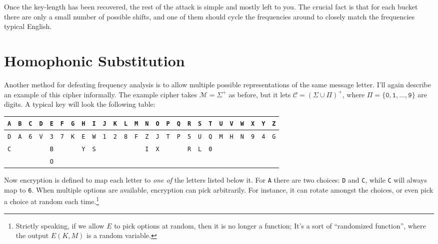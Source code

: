 \documentclass[11pt]{article}
\newcommand{\msgs}{\mathcal{M}}
\newcommand{\ctxts}{\mathcal{C}}
\newcommand{\enc}{E}
\begin{document}
Once the key-length has been recovered, the rest of the attack is simple
and mostly left to you. The crucial fact is that for each bucket there
are only a small number of possible shifts, and one of them should cycle
the frequencies around to closely match the frequencies typical English.

\section{Homophonic Substitution}

Another method for defeating frequency analysis is to allow multiple possible
representations of the same message letter. I'll again describe an example of
this cipher informally.  The example cipher takes $\msgs = \Sigma^+$ as before,
but it lets $\ctxts = (\Sigma\cup\Pi)^+$, where $\Pi =
\{\mathtt{0},\mathtt{1},\ldots,\mathtt{9}\}$ are digits.  A typical key
will look the following table:

\begin{small}
\begin{tabular}{*{26}{c}}
    \texttt{A} &
    \texttt{B} &
    \texttt{C} &
    \texttt{D} &
    \texttt{E} &
    \texttt{F} &
    \texttt{G} &
    \texttt{H} &
    \texttt{I} &
    \texttt{J} &
    \texttt{K} &
    \texttt{L} &
    \texttt{M} &
    \texttt{N} &
    \texttt{O} &
    \texttt{P} &
    \texttt{Q} &
    \texttt{R} &
    \texttt{S} &
    \texttt{T} &
    \texttt{U} &
    \texttt{V} &
    \texttt{W} &
    \texttt{X} &
    \texttt{Y} &
    \texttt{Z} \\
\hline
    \texttt{D} &
    \texttt{A} &
    \texttt{6} &
    \texttt{V} &
    \texttt{3}&
    \texttt{7}&
    \texttt{K}&
    \texttt{E}&
    \texttt{W}&
    \texttt{1}&
    \texttt{2}&
    \texttt{8}&
    \texttt{F}&
    \texttt{Z}&
    \texttt{J}&
    \texttt{T}&
    \texttt{P}&
    \texttt{5}&
    \texttt{U}&
    \texttt{Q}&
    \texttt{M}&
    \texttt{H}&
    \texttt{N}&
    \texttt{9}&
    \texttt{4}&
    \texttt{G} \\

    \texttt{C} &
    &
    &
    &
    \texttt{B} &
    &
    &
    \texttt{Y} &
    \texttt{S} &
    &
    &
    &
    &
    \texttt{I} &
    \texttt{X} &
    &
    &
    \texttt{R} &
    \texttt{L} &
    \texttt{0} \\
    &
    &
    &
    &
    \texttt{O}
\end{tabular}
\end{small}

Now encryption is defined to map each letter to \emph{one of} the letters
listed below it. For \texttt{A} there are two choices: \texttt{D} and
\texttt{C}, while \texttt{C} will always map to \texttt{6}. When multiple
options are available, encryption can pick arbitrarily. For instance, it
can rotate amongst the choices, or even pick a choice at random each
time.\footnote{Strictly speaking, if we allow $\enc$ to pick options at
random, then it is no longer a function; It's a sort of ``randomized
function'', where the output $\enc(K,M)$ is a random variable.}
\end{document}
